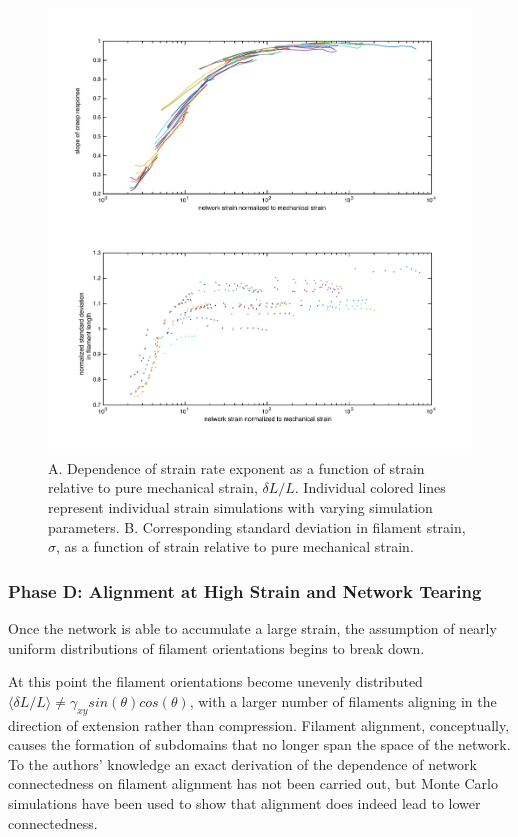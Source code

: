 \documentclass[pre,preprint]{revtex4-1}
\begin{document}
\begin{figure}[h!]
\centering
\includegraphics[width=\hsize]{strain_collapse}
\caption{\label{fig:strain_coll} A. Dependence of strain rate exponent as a function of strain relative to pure mechanical strain, $\delta L/L$.  Individual colored lines represent individual strain simulations with varying simulation parameters.  B.  Corresponding standard deviation in filament strain, $\sigma$, as a function of strain relative to pure mechanical strain. }
\end{figure}

\subsubsection{Phase D: Alignment at High Strain and Network Tearing}

Once the network is able to accumulate a large strain, the assumption of nearly uniform distributions of filament orientations begins to break down.

At this point the filament orientations become unevenly distributed $\langle \delta L / L \rangle \neq \gamma_{xy}sin(\theta)cos(\theta)$, with a larger number of filaments aligning in the direction of extension rather than compression.  Filament alignment, conceptually, causes the formation of subdomains that no longer span the space of the network. To the authors' knowledge an exact derivation of the dependence of network connectedness on filament alignment has not been carried out, but Monte Carlo simulations have been used to show that alignment does indeed lead to lower connectedness\cite{model_percolationanisotropy}.
\end{document}
